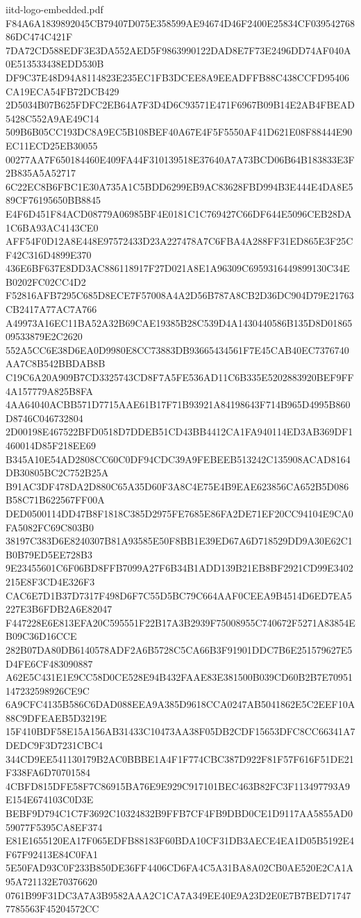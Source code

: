 \begin{filecontents*}[overwrite]{iitd-logo-embedded.pdf}
F84A6A1839892045CB79407D075E358599AE94674D46F2400E25834CF03954276886DC474C421F
7DA72CD588EDF3E3DA552AED5F9863990122DAD8E7F73E2496DD74AF040A0E513533438EDD530B
DF9C37E48D94A8114823E235EC1FB3DCEE8A9EEADFFB88C438CCFD95406CA19ECA54FB72DCB429
2D5034B07B625FDFC2EB64A7F3D4D6C93571E471F6967B09B14E2AB4FBEAD5428C552A9AE49C14
509B6B05CC193DC8A9EC5B108BEF40A67E4F5F5550AF41D621E08F88444E90EC11ECD25EB30055
00277AA7F650184460E409FA44F310139518E37640A7A73BCD06B64B183833E3F2B835A5A52717
6C22EC8B6FBC1E30A735A1C5BDD6299EB9AC83628FBD994B3E444E4DA8E589CF76195650BB8845
E4F6D451F84ACD08779A06985BF4E0181C1C769427C66DF644E5096CEB28DA1C6BA93AC4143CE0
AFF54F0D12A8E448E97572433D23A227478A7C6FBA4A288FF31ED865E3F25CF42C316D4899E370
436E6BF637E8DD3AC886118917F27D021A8E1A96309C6959316449899130C34EB0202FC02CC4D2
F52816AFB7295C685D8ECE7F57008A4A2D56B787A8CB2D36DC904D79E21763CB2417A77AC7A766
A49973A16EC11BA52A32B69CAE19385B28C539D4A1430440586B135D8D0186509533879E2C2620
552A5CC6E38D6EA0D9980E8CC73883DB93665434561F7E45CAB40EC7376740AA7C8B542BBDAB8B
C19C6A20A909B7CD3325743CD8F7A5FE536AD11C6B335E5202883920BEF9FF4A157779A825B8FA
4AA64040ACBB571D7715AAE61B17F71B93921A84198643F714B965D4995B860D8746C046732804
2D00198E467522BFD0518D7DDEB51CD43BB4412CA1FA940114ED3AB369DF1460014D85F218EE69
B345A10E54AD2808CC60C0DF94CDC39A9FEBEEB513242C135908ACAD8164DB30805BC2C752B25A
B91AC3DF478DA2D880C65A35D60F3A8C4E75E4B9EAE623856CA652B5D086B58C71B622567FF00A
DED0500114DD47B8F1818C385D2975FE7685E86FA2DE71EF20CC94104E9CA0FA5082FC69C803B0
38197C383D6E8240307B81A93585E50F8BB1E39ED67A6D718529DD9A30E62C1B0B79ED5EE728B3
9E23455601C6F06BD8FFB7099A27F6B34B1ADD139B21EB8BF2921CD99E3402215E8F3CD4E326F3
CAC6E7D1B37D7317F498D6F7C55D5BC79C664AAF0CEEA9B4514D6ED7EA5227E3B6FDB2A6E82047
F447228E6E813EFA20C595551F22B17A3B2939F75008955C740672F5271A83854EB09C36D16CCE
282B07DA80DB6140578ADF2A6B5728C5CA66B3F91901DDC7B6E251579627E5D4FE6CF483090887
A62E5C431E1E9CC58D0CE528E94B432FAAE83E381500B039CD60B2B7E70951147232598926CE9C
6A9CFC4135B586C6DAD088EEA9A385D9618CCA0247AB5041862E5C2EEF10A88C9DFEAEB5D3219E
15F410BDF58E15A156AB31433C10473AA38F05DB2CDF15653DFC8CC66341A7DEDC9F3D7231CBC4
344CD9EE541130179B2AC0BBBE1A4F1F774CBC387D922F81F57F616F51DE21F338FA6D70701584
4CBFD815DFE58F7C86915BA76E9E929C917101BEC463B82FC3F113497793A9E154E674103C0D3E
BEBF9D794C1C7F3692C10324832B9FFB7CF4FB9DBD0CE1D9117AA5855AD059077F5395CA8EF374
E81E1655120EA17F065EDFB88183F60BDA10CF31DB3AECE4EA1D05B5192E4F67F92413E84C0FA1
5E50FAD93C0F233B850DE36FF4406CD6FA4C5A31BA8A02CB0AE520E2CA1A95A721132E70376620
0761B99F31DC3A7A3B9582AAA2C1CA7A349EE40E9A23D2E0E7B7BED717477785563F45204572CC

\end{filecontents*}
